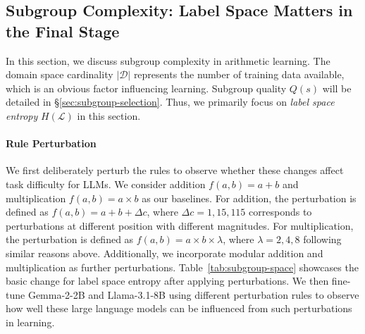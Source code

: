 \documentclass[11pt]{article}
\begin{document}
\subsection{Subgroup Complexity: Label Space Matters in the Final Stage }
\label{sec:subgroup-complexity}
 In this section, we discuss subgroup complexity in arithmetic learning. The domain space cardinality $|\mathcal{D}|$ represents the number of training data available, which is an obvious factor influencing learning. Subgroup quality $Q(s)$ will be detailed in \S\ref{sec:subgroup-selection}. Thus, we primarily focus on \textit{label space entropy} $H(\mathcal{L})$ in this section.

\paragraph{Rule Perturbation}
We first deliberately perturb the rules to observe whether these changes affect task difficulty for LLMs. We consider addition $ f(a,b) = a + b$ and multiplication $ f(a,b) = a \times b $ as our baselines. For addition, the perturbation is defined as $ f(a,b) = a + b + \Delta c $, where $ \Delta c = 1, 15, 115 $ corresponds to perturbations at different position with different magnitudes. For multiplication, the perturbation is defined as $ f(a,b) = a \times b \times \lambda $, where $ \lambda = 2, 4, 8 $ following similar reasons above. Additionally, we incorporate modular addition and multiplication as further perturbations. Table~\ref{tab:subgroup-space} showcases the basic change for label space entropy after applying perturbations. We then fine-tune Gemma-2-2B and Llama-3.1-8B using different perturbation rules to observe how well these large language models can be influenced from such perturbations in learning.
\end{document}
